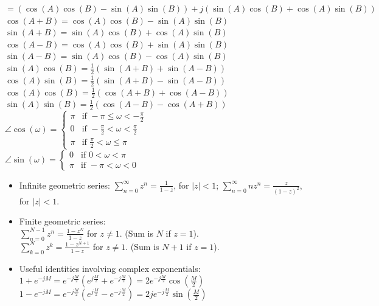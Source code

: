 \documentclass[10pt, twocolumn]{article}
\begin{document}
\begin{itemize}
    \hspace*{1em}$= (\cos(A)\cos(B) - \sin(A)\sin(B)) + j(\sin(A)\cos(B) + \cos(A)\sin(B))$ \\
    $\cos(A+B) = \cos(A)\cos(B) - \sin(A)\sin(B)$ \\
    $\sin(A+B) = \sin(A)\cos(B) + \cos(A)\sin(B)$ \\
    $\cos(A-B) = \cos(A)\cos(B) + \sin(A)\sin(B)$ \\
    $\sin(A-B) = \sin(A)\cos(B) - \cos(A)\sin(B)$ \\
    $\sin(A)\cos(B) = \frac{1}{2}(\sin(A+B) + \sin(A-B))$ \\
    $\cos(A)\sin(B) = \frac{1}{2}(\sin(A+B) - \sin(A-B))$ \\
    $\cos(A)\cos(B) = \frac{1}{2}(\cos(A+B) + \cos(A-B))$ \\
    $\sin(A)\sin(B) = \frac{1}{2}(\cos(A-B) - \cos(A+B))$ \\
    $\angle\cos(\omega) = \begin{cases} \pi & \text{if } -\pi \le \omega < -\frac{\pi}{2} \\ 0 & \text{if } -\frac{\pi}{2} < \omega < \frac{\pi}{2} \\ \pi & \text{if } \frac{\pi}{2} < \omega \le \pi \end{cases}$ \\
    $\angle\sin(\omega) = \begin{cases} 0 & \text{if } 0 < \omega < \pi \\ \pi & \text{if } -\pi < \omega < 0 \end{cases}$
\end{itemize}
\begin{itemize}
    \item Infinite geometric series: $\sum_{n=0}^{\infty} z^n = \frac{1}{1-z}$, for $|z|<1$; $\sum_{n=0}^{\infty} nz^n = \frac{z}{(1-z)^2}$, for $|z|<1$.
    \item Finite geometric series: \\
    $\sum_{n=0}^{N-1} z^n = \frac{1-z^N}{1-z}$ for $z \neq 1$. (Sum is $N$ if $z=1$). \\
    $\sum_{k=0}^{N} z^k = \frac{1-z^{N+1}}{1-z}$ for $z \neq 1$. (Sum is $N+1$ if $z=1$).
    \item Useful identities involving complex exponentials: \\
    $1+e^{-jM} = e^{-j\frac{M}{2}} (e^{j\frac{M}{2}} + e^{-j\frac{M}{2}}) = 2e^{-j\frac{M}{2}}\cos\left(\frac{M}{2}\right)$ \\
    $1-e^{-jM} = e^{-j\frac{M}{2}} (e^{j\frac{M}{2}} - e^{-j\frac{M}{2}}) = 2je^{-j\frac{M}{2}}\sin\left(\frac{M}{2}\right)$
\end{itemize}
\end{document}
